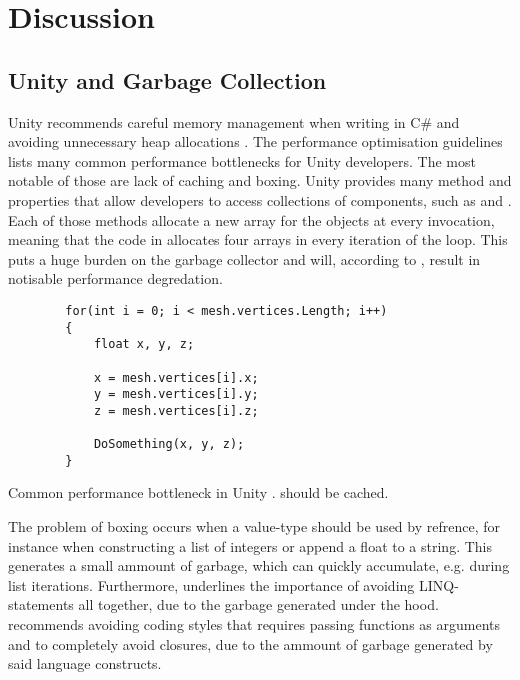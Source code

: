 \chapter{Discussion}

\section{Unity and Garbage Collection}
Unity recommends careful memory management when writing in C\# and avoiding unnecessary heap allocations \cite{unity:optimisation}. The performance optimisation guidelines \cite{unity:optimisation} lists many common performance bottlenecks for Unity developers. The most notable of those are lack of caching and boxing. Unity provides many method and properties that allow developers to access collections of components, such as  and  \cite{unity:optimisation, unity:heap}. Each of those methods allocate a new array for the objects at every invocation, meaning that the code in  allocates four arrays in every iteration of the loop. This puts a huge burden on the garbage collector and will, according to \cite{unity:heap}, result in notisable performance degredation.

\begin{listing}
    \begin{verbatim}
        for(int i = 0; i < mesh.vertices.Length; i++)
        {
            float x, y, z;
        
            x = mesh.vertices[i].x;
            y = mesh.vertices[i].y;
            z = mesh.vertices[i].z;
        
            DoSomething(x, y, z);
        }
    \end{verbatim}
    \caption{Common performance bottleneck in Unity \cite{unity:heap}.  should be cached.} \label{lst:unity:array:prop}
\end{listing}

The problem of boxing occurs when a value-type should be used by refrence, for instance when constructing a list of integers or append a float to a string. This generates a small ammount of garbage, which can quickly accumulate, e.g. during list iterations. Furthermore, \cite{unity:optimisation} underlines the importance of avoiding \gls{LINQ}-statements all together, due to the garbage generated under the hood. \cite{unity:heap} recommends avoiding coding styles that requires passing functions as arguments and to completely avoid closures, due to the ammount of garbage generated by said language constructs. 

